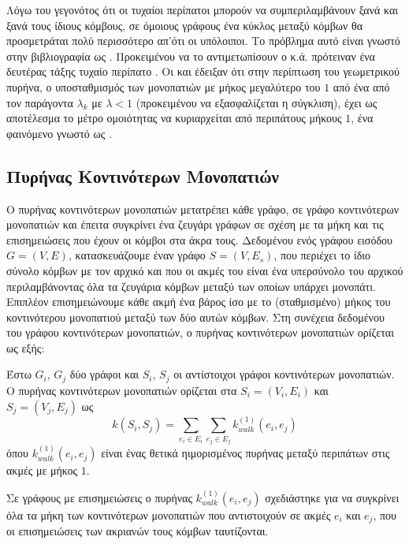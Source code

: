 Λόγω του γεγονότος ότι οι τυχαίοι περίπατοι μπορούν να συμπεριλαμβάνουν ξανά και ξανά τους ίδιους κόμβους, σε όμοιους γράφους ένα κύκλος μεταξύ κόμβων θα προσμετράται πολύ περισσότερο απ'ότι οι υπόλοιποι. Το πρόβλημα αυτό είναι γνωστό στην βιβλιογραφία ως .
Προκειμένου να το αντιμετωπίσουν ο  κ.ά. πρότειναν ένα δευτέρας τάξης τυχαίο περίπατο .
Οι  και  έδειξαν ότι στην περίπτωση του γεωμετρικού πυρήνα, ο υποσταθμισμός των μονοπατιών με μήκος μεγαλύτερο του $1$ από ένα από τον παράγοντα $λ_{k}$ με $λ<1$ (προκειμένου να εξασφαλίζεται η σύγκλιση), έχει ως αποτέλεσμα το μέτρο ομοιότητας να κυριαρχείται από περιπάτους μήκους $1$, ένα φαινόμενο γνωστό ως  \cite{sugiyama2015halting}.

\subsection{Πυρήνας Κοντινότερων Μονοπατιών}
\label{ssec:sp}
Ο πυρήνας κοντινότερων μονοπατιών  μετατρέπει κάθε γράφο, σε γράφο κοντινότερων μονοπατιών και έπειτα συγκρίνει ένα ζευγάρι γράφων σε σχέση με τα μήκη και τις επισημειώσεις που έχουν οι κόμβοι στα άκρα τους.
Δεδομένου ενός γράφου εισόδου $G=(V,E)$, κατασκευάζουμε έναν γράφο  $S=(V,E_s)$, που περιέχει το ίδιο σύνολο κόμβων με τον αρχικό και που οι ακμές του είναι ένα υπερσύνολο του αρχικού περιλαμβάνοντας όλα τα ζευγάρια κόμβων μεταξύ των οποίων υπάρχει μονοπάτι.
Επιπλέον επισημειώνουμε κάθε ακμή ένα βάρος ίσο με το (σταθμισμένο) μήκος του κοντινότερου μονοπατιού μεταξύ των δύο αυτών κόμβων.
Στη συνέχεια δεδομένου του γράφου κοντινότερων μονοπατιών, ο πυρήνας κοντινότερων μονοπατιών ορίζεται ως εξής:
\begin{definition}
	Έστω $G_i$, $G_j$ δύο γράφοι και $S_i$, $S_j$ οι αντίστοιχοι γράφοι κοντινότερων μονοπατιών.
	Ο πυρήνας κοντινότερων μονοπατιών ορίζεται στα $S_i=(V_i,E_i)$ και $S_j=(V_j,E_j)$ ως
	\begin{equation}
		k(S_i,S_j) = \sum_{e_i \in E_i} \sum_{e_j \in E_j} k_{walk}^{(1)}(e_i, e_j)
	\end{equation}
	όπου $k_{walk}^{(1)}(e_i, e_j)$ είναι ένας θετικά ηιμορισμένος πυρήνας μεταξύ περιπάτων στις ακμές με μήκος $1$.
\end{definition}
Σε γράφους με επισημειώσεις ο πυρήνας $k_{walk}^{(1)}(e_i, e_j)$ σχεδιάστηκε για να συγκρίνει όλα τα μήκη των κοντινότερων μονοπατιών που αντιστοιχούν σε ακμές $e_i$ και $e_j$, που οι επισημειώσεις των ακριανών τους κόμβων ταυτίζονται.
